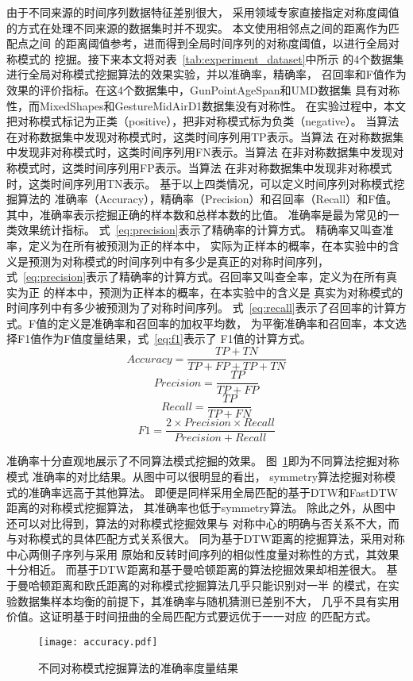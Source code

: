 由于不同来源的时间序列数据特征差别很大，
采用领域专家直接指定对称度阈值的方式在处理不同来源的数据集时并不现实。
本文使用相邻点之间的距离作为匹配点之间
的距离阈值参考，进而得到全局时间序列的对称度阈值，以进行全局对称模式的
挖掘。接下来本文将对表~\ref{tab:experiment_dataset}中所示
的4个数据集进行全局对称模式挖掘算法的效果实验，并以准确率，精确率，
召回率和F值作为效果的评价指标。在这4个数据集中，GunPointAgeSpan和UMD数据集
具有对称性，而MixedShapes和GestureMidAirD1数据集没有对称性。
在实验过程中，本文把对称模式标记为正类（positive），把非对称模式标为负类（negative）。
当算法在对称数据集中发现对称模式时，这类时间序列用TP表示。当算法
在对称数据集中发现非对称模式时，这类时间序列用FN表示。当算法
在非对称数据集中发现对称模式时，这类时间序列用FP表示。当算法
在非对称数据集中发现非对称模式时，这类时间序列用TN表示。
基于以上四类情况，可以定义时间序列对称模式挖掘算法的
准确率（Accuracy），精确率（Precision）和召回率（Recall）和F值。
其中，准确率表示挖掘正确的样本数和总样本数的比值。
准确率是最为常见的一类效果统计指标。
式~\ref{eq:precision}表示了精确率的计算方式。
精确率又叫查准率，定义为在所有被预测为正的样本中，
实际为正样本的概率，在本实验中的含义是预测为对称模式的时间序列中有多少是真正的对称时间序列，
式~\ref{eq:precision}表示了精确率的计算方式。召回率又叫查全率，定义为在所有真实为正
的样本中，预测为正样本的概率，在本实验中的含义是
真实为对称模式的时间序列中有多少被预测为了对称时间序列。
式~\ref{eq:recall}表示了召回率的计算方式。F值的定义是准确率和召回率的加权平均数，
为平衡准确率和召回率，本文选择F1值作为F值度量结果，式~\ref{eq:f1}表示了
F1值的计算方式。
\begin{equation}
  Accuracy=\frac{TP+TN}{TP+FP+TP+TN}
  \label{eq:Accuracy}
\end{equation}
\begin{equation}
  Precision=\frac{TP}{TP+FP}
  \label{eq:precision}
\end{equation}
\begin{equation}
  Recall=\frac{TP}{TP+FN}
  \label{eq:recall}
\end{equation}
\begin{equation}
  F1=\frac{2 \times Precision \times Recall}{Precision+Recall}
  \label{eq:f1}
\end{equation}

准确率十分直观地展示了不同算法模式挖掘的效果。
图~\ref{fig:accuracy_compare}即为不同算法挖掘对称模式
准确率的对比结果。从图中可以很明显的看出，
symmetry算法挖掘对称模式的准确率远高于其他算法。
即便是同样采用全局匹配的基于DTW和FastDTW距离的对称模式挖掘算法，
其准确率也低于symmetry算法。
除此之外，从图中还可以对比得到，算法的对称模式挖掘效果与
对称中心的明确与否关系不大，而与对称模式的具体匹配方式关系很大。
同为基于DTW距离的挖掘算法，采用对称中心两侧子序列与采用
原始和反转时间序列的相似性度量对称性的方式，其效果十分相近。
而基于DTW距离和基于曼哈顿距离的算法挖掘效果却相差很大。
基于曼哈顿距离和欧氏距离的对称模式挖掘算法几乎只能识别对一半
的模式，在实验数据集样本均衡的前提下，其准确率与随机猜测已差别不大，
几乎不具有实用价值。这证明基于时间扭曲的全局匹配方式要远优于一一对应
的匹配方式。
\begin{figure}
  \centering
  \texttt{[image: accuracy.pdf]}
  \caption{不同对称模式挖掘算法的准确率度量结果}
  \label{fig:accuracy_compare}
\end{figure}

